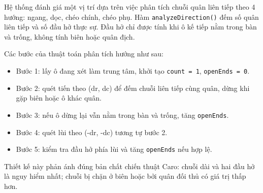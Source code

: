\setlength{\parindent}{1.5em} Hệ thống đánh giá một vị trí dựa trên việc phân tích chuỗi quân liên tiếp theo 4 hướng: ngang, dọc, chéo chính, chéo phụ. Hàm \texttt{analyzeDirection()} đếm số quân liên tiếp và số đầu hở thực sự. Đầu hở chỉ được tính khi ô kế tiếp nằm trong bàn và trống, không tính biên hoặc quân địch.

\setlength{\parindent}{1.5em} Các bước của thuật toán phân tích hướng như sau:
\begin{itemize}
	\item Bước 1: lấy ô đang xét làm trung tâm, khởi tạo \texttt{count = 1}, \texttt{openEnds = 0}.
	\item Bước 2: quét tiến theo (dr, dc) để đếm chuỗi liên tiếp cùng quân, dừng khi gặp biên hoặc ô khác quân.
	\item Bước 3: nếu ô dừng lại vẫn nằm trong bàn và trống, tăng \texttt{openEnds}.
	\item Bước 4: quét lùi theo (-dr, -dc) tương tự bước 2.
	\item Bước 5: kiểm tra đầu hở phía lùi và tăng \texttt{openEnds} nếu hợp lệ.
\end{itemize}
\setlength{\parindent}{1.5em} Thiết kế này phản ánh đúng bản chất chiến thuật Caro: chuỗi dài và hai đầu hở là nguy hiểm nhất; chuỗi bị chặn ở biên hoặc bởi quân đối thủ có giá trị thấp hơn.

